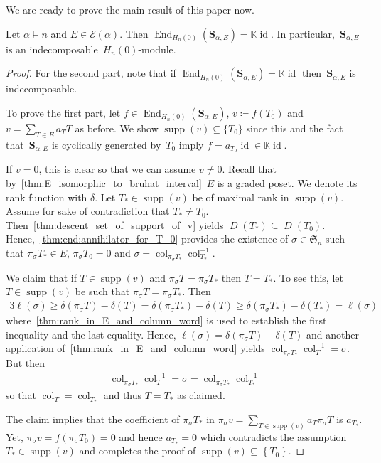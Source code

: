 \documentclass[ALCO,ThmDefs,Unicode,epreuves]{cedram}
\newcommand{\bs}[1]{\boldsymbol{#1} }
\newcommand{\mc}[1]{\mathcal{#1} }
\newcommand{\K}{\mathbb K}
\newcommand{\D}{\operatorname{\mathit{D}}}
\DeclareMathOperator{\id}{id}
\DeclareMathOperator{\supp}{supp}
\DeclareMathOperator{\End}{End}
\newcommand{\set}[1]{\left\{ #1 \right\}}
\newcommand{\fS}{\mathfrak{S}}
\newcommand{\col}{\operatorname{col}}
\newcommand{\He}{H_n(0)}
\newcommand{\se}{\bs S_{\alpha,E}}
\begin{document}
We are ready to prove the main result of this paper now.

\begin{thm}	\label{thm:end:end_is_c}
	Let $\alpha \vDash n$ and $E\in \mc E(\alpha)$. Then $\End_{\He}(\bs S_{\alpha,E})=\K \id$. In particular,~$\se$ is an indecomposable~$\He$-module.
\end{thm}

\begin{proof} 
	For the second part, note that if $\End_{\He}(\bs S_{\alpha,E})=\K \id$ then~$\se$ is indecomposable. 
		
	To prove the first part, let $f\in \End_{\He}(\se)$, $v\coloneqq f(T_0)$ and $v = \sum_{T\in E} a_T T$ as before.
	We show $\supp(v) \subseteq \{T_0\}$ since this and the fact that~$\se$ is cyclically generated by~$T_0$ imply $f = a_{T_0}\id\in \K \id$.
	
		
	If $v=0$, this is clear so that we can assume $v\neq 0$. Recall that by~\cref{thm:E_isomorphic_to_bruhat_interval}~$E$ is a graded poset. We denote its rank function with $\delta$.
	Let $T_*\in \supp(v)$ be of maximal rank in $\supp(v)$. Assume for sake of contradiction that $T_* \neq T_0$. Then~\cref{thm:descent_set_of_support_of_v} yields $\D(T_*) \subseteq \D(T_0)$. Hence,~\cref{thm:end:annihilator_for_T_0} provides the existence of $\sigma \in \fS_n$ such that $\pi_\sigma T_*\in E$, $\pi_\sigma T_0 = 0$ and $\sigma = \col_{\pi_\sigma T_*}\col_{T_*}^{-1}$.
	
	We claim that if $T\in \supp(v)$ and $\pi_\sigma T = \pi_\sigma T_*$ then $T = T_*$.
	To see this, let $T\in \supp(v)$ be such that $\pi_\sigma T = \pi_\sigma T_*$. Then
		\begin{alignat*}{3}
			\ell(\sigma) 
			\geq \delta(\pi_\sigma T) - \delta(T)
			= \delta(\pi_\sigma T_*) - \delta(T) 
			\geq \delta(\pi_\sigma T_*) - \delta(T_*) 
			= \ell(\sigma)
		\end{alignat*}
		where~\cref{thm:rank_in_E_and_column_word} is used to establish the first inequality and the last equality. Hence, 	$\ell(\sigma)= \delta(\pi_\sigma T) - \delta(T)$ and another application of~\cref{thm:rank_in_E_and_column_word} yields $\col_{\pi_\sigma T_*}\col^{-1}_{T} = \sigma$. But then
		\begin{align*}
		\col_{\pi_\sigma T_*}\col^{-1}_{T} = \sigma= \col_{\pi_\sigma T_*}\col_{T_*}^{-1}
		\end{align*}
		 so that $\col_T = \col_{T_*}$ and thus $T = T_*$ as claimed.
		
	The claim implies that the coefficient of $\pi_\sigma T_*$ in $\pi_\sigma v = \sum_{T \in \supp(v)} a_T \pi_\sigma T$ is $a_{T_*}$.	
	Yet, $\pi_\sigma v = f(\pi_\sigma T_0) = 0$ and hence $a_{T_*} = 0$ which contradicts the assumption $T_* \in \supp(v)$ and completes the proof of $\supp(v) \subseteq \set{T_0}$.
\end{proof}
\end{document}

